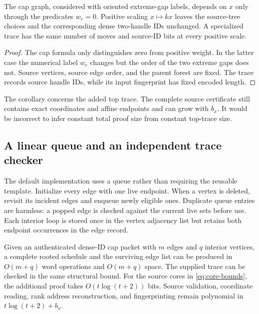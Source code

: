 \begin{corollary}
\label{cor:support}
The cap graph, considered with oriented extreme-gap labels, depends on $x$
only through the predicates $w_e=0$. Positive scaling $x\mapsto kx$ leaves
the source-tree choices and the corresponding dense two-handle IDs
unchanged. A specialized trace has the same number of moves and source-ID
bits at every positive scale.
\end{corollary}

\begin{proof}
The cap formula only distinguishes zero from positive weight. In the latter
case the numerical label $w_e$ changes but the order of the two extreme
gaps does not. Source vertices, source edge order, and the parent forest
are fixed. The trace records source handle IDs, while its input fingerprint
has fixed encoded length.
\end{proof}

The corollary concerns the added top trace. The complete source certificate
still contains exact coordinates and affine endpoints and can grow with
$b_x$. It would be incorrect to infer constant total proof size from constant
top-trace size.

\subsection{A linear queue and an independent trace checker}

The default implementation uses a queue rather than requiring the reusable
template. Initialize every edge with one live endpoint. When a vertex is
deleted, revisit its incident edges and enqueue newly eligible ones.
Duplicate queue entries are harmless: a popped edge is checked against the
current live sets before use. Each interior loop is stored once in the
vertex adjacency list but retains both endpoint occurrences in the edge
record.

\begin{proposition}
\label{prop:cost}
Given an authenticated dense-ID cap packet with $m$ edges and $q$ interior
vertices, a complete rooted schedule and the surviving edge list can be
produced in $O(m+q)$ word operations and $O(m+q)$ space. The supplied trace
can be checked in the same structural bound. For the source cores in
\eqref{eq:core-bounds}, the additional proof takes
$O(t\log(t+2))$ bits. Source validation, coordinate reading, rank address
reconstruction, and fingerprinting remain polynomial in
$t\log(t+2)+b_x$.
\end{proposition}

